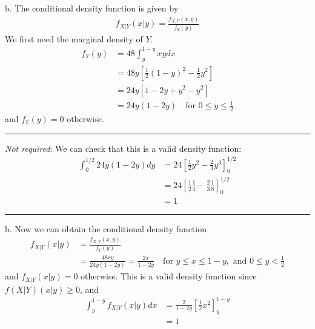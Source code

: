 \begin{exercise}
\begin{solution}
 b.
        The conditional density function is given by
        \begin{align*}
            f_{X|Y}(x|y) = \frac{f_{X,Y}(x,y)}{f_{Y}(y)}
        \end{align*}
        We first need the marginal density of $Y$.
        \begin{align*}
            f_{Y}(y)& = 48\int_{y}^{1-y}xydx\\
            & = 48y\left[\frac{1}{2}(1-y)^2-\frac{1}{2}y^2\right]\\
            &=24y\left[1-2y+y^2-y^2\right]\\
            &=24y(1-2y)\quad\text{for } 0\leq y\leq \frac{1}{2}
        \end{align*}
        and $f_{Y}(y)=0$ otherwise.
        \hrule\vspace{0.2cm}
        \textit{Not required}: We can check that this is a valid density function:
        \begin{align*}
            \int_{0}^{1/2}24y(1-2y)dy &= 24\left[\frac{1}{2}y^2-\frac{2}{3}y^3\right]^{1/2}_{0}\\
            & = 24\left[\frac{1}{2}\frac{1}{4}-\frac{2}{3}\frac{1}{8}\right]^{1/2}_{0}\\
            &=1
        \end{align*}
        \hrule\vspace{0.2cm}

b. Now we can obtain the conditional density function
        \begin{align*}
            f_{X|Y}(x|y) &=\frac{f_{X,Y}(x,y)}{f_{Y}(y)}\\
            &= \frac{48xy}{24y(1-2y)} = \frac{2x}{1-2y} \quad \text{for } y\leq x\leq 1-y, \text{ and } 0\leq y<\frac{1}{2}
        \end{align*}
        and $f_{X|Y}(x|y)=0$ otherwise. \newline\newline
        This is a valid density function since $f(X|Y)(x|y)\geq 0$, and
        \begin{align*}
            \int_{y}^{1-y}f_{X|Y}(x|y)dx & = \frac{2}{1-2y}\left[\frac{1}{2}x^2\right]^{1-y}_{y}\\
            &=1
        \end{align*}
\end{solution}
\end{exercise}

